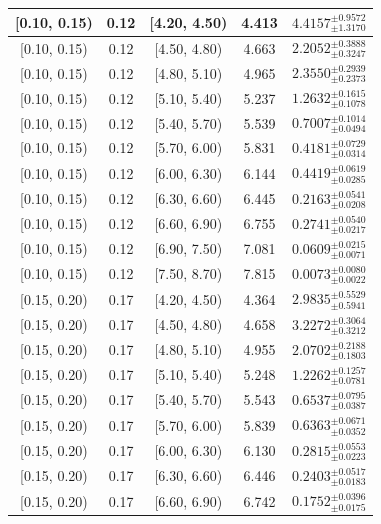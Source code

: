 \begin{longtable}{|c|c|c|c|c|}
\hline
[0.10, 0.15) & 0.12 & [4.20, 4.50) & 4.413 & $4.4157^{ \pm 0.9572 }_{ \pm 1.3170 }$ \\ 
\hline
[0.10, 0.15) & 0.12 & [4.50, 4.80) & 4.663 & $2.2052^{ \pm 0.3888 }_{ \pm 0.3247 }$ \\ 
\hline
[0.10, 0.15) & 0.12 & [4.80, 5.10) & 4.965 & $2.3550^{ \pm 0.2939 }_{ \pm 0.2373 }$ \\ 
\hline
[0.10, 0.15) & 0.12 & [5.10, 5.40) & 5.237 & $1.2632^{ \pm 0.1615 }_{ \pm 0.1078 }$ \\ 
\hline
[0.10, 0.15) & 0.12 & [5.40, 5.70) & 5.539 & $0.7007^{ \pm 0.1014 }_{ \pm 0.0494 }$ \\ 
\hline
[0.10, 0.15) & 0.12 & [5.70, 6.00) & 5.831 & $0.4181^{ \pm 0.0729 }_{ \pm 0.0314 }$ \\ 
\hline
[0.10, 0.15) & 0.12 & [6.00, 6.30) & 6.144 & $0.4419^{ \pm 0.0619 }_{ \pm 0.0285 }$ \\ 
\hline
[0.10, 0.15) & 0.12 & [6.30, 6.60) & 6.445 & $0.2163^{ \pm 0.0541 }_{ \pm 0.0208 }$ \\ 
\hline
[0.10, 0.15) & 0.12 & [6.60, 6.90) & 6.755 & $0.2741^{ \pm 0.0540 }_{ \pm 0.0217 }$ \\ 
\hline
[0.10, 0.15) & 0.12 & [6.90, 7.50) & 7.081 & $0.0609^{ \pm 0.0215 }_{ \pm 0.0071 }$ \\ 
\hline
[0.10, 0.15) & 0.12 & [7.50, 8.70) & 7.815 & $0.0073^{ \pm 0.0080 }_{ \pm 0.0022 }$ \\ 
\hline
[0.15, 0.20) & 0.17 & [4.20, 4.50) & 4.364 & $2.9835^{ \pm 0.5529 }_{ \pm 0.5941 }$ \\ 
\hline
[0.15, 0.20) & 0.17 & [4.50, 4.80) & 4.658 & $3.2272^{ \pm 0.3064 }_{ \pm 0.3212 }$ \\ 
\hline
[0.15, 0.20) & 0.17 & [4.80, 5.10) & 4.955 & $2.0702^{ \pm 0.2188 }_{ \pm 0.1803 }$ \\ 
\hline
[0.15, 0.20) & 0.17 & [5.10, 5.40) & 5.248 & $1.2262^{ \pm 0.1257 }_{ \pm 0.0781 }$ \\ 
\hline
[0.15, 0.20) & 0.17 & [5.40, 5.70) & 5.543 & $0.6537^{ \pm 0.0795 }_{ \pm 0.0387 }$ \\ 
\hline
[0.15, 0.20) & 0.17 & [5.70, 6.00) & 5.839 & $0.6363^{ \pm 0.0671 }_{ \pm 0.0352 }$ \\ 
\hline
[0.15, 0.20) & 0.17 & [6.00, 6.30) & 6.130 & $0.2815^{ \pm 0.0553 }_{ \pm 0.0223 }$ \\ 
\hline
[0.15, 0.20) & 0.17 & [6.30, 6.60) & 6.446 & $0.2403^{ \pm 0.0517 }_{ \pm 0.0183 }$ \\ 
\hline
[0.15, 0.20) & 0.17 & [6.60, 6.90) & 6.742 & $0.1752^{ \pm 0.0396 }_{ \pm 0.0175 }$ \\ 

\end{longtable}

